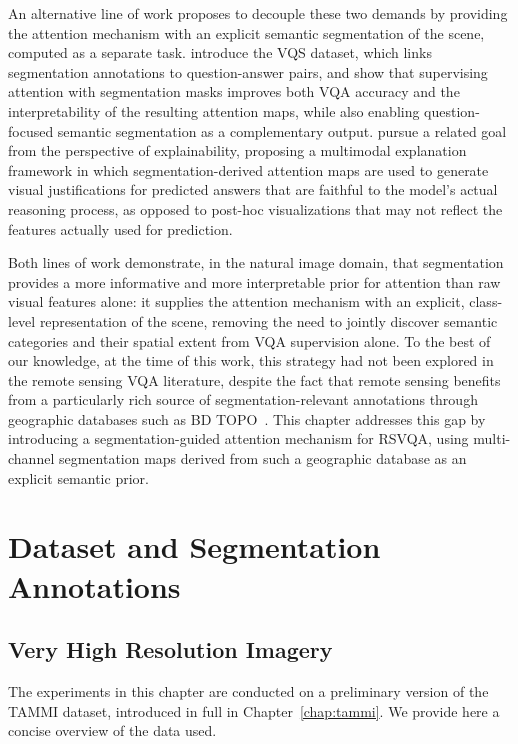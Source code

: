 An alternative line of work proposes to decouple these two
demands by providing the attention mechanism with an
explicit semantic segmentation of the scene, computed as
a separate task. \textcite{gan2017vqs} introduce the VQS
dataset, which links segmentation annotations to
question-answer pairs, and show that supervising attention
with segmentation masks improves both VQA accuracy and
the interpretability of the resulting attention maps, while
also enabling question-focused semantic segmentation as a
complementary output. \textcite{wu2018faithful} pursue a
related goal from the perspective of explainability,
proposing a multimodal explanation framework in which
segmentation-derived attention maps are used to generate
visual justifications for predicted answers that are
faithful to the model's actual reasoning process, as
opposed to post-hoc visualizations that may not reflect
the features actually used for prediction.

Both lines of work demonstrate, in the natural image
domain, that segmentation provides a more informative and
more interpretable prior for attention than raw visual
features alone: it supplies the attention mechanism with
an explicit, class-level representation of the scene,
removing the need to jointly discover semantic categories
and their spatial extent from VQA supervision alone. To
the best of our knowledge, at the time of this work, this
strategy had not been explored in the remote sensing VQA
literature, despite the fact that remote sensing benefits
from a particularly rich source of segmentation-relevant
annotations through geographic databases such as BD
TOPO~\cite{bdtopo}. This chapter addresses this gap by
introducing a segmentation-guided attention mechanism for
RSVQA, using multi-channel segmentation maps derived from
such a geographic database as an explicit semantic prior.

\section{Dataset and Segmentation Annotations}
\label{sec:chap4_dataset}

\subsection{Very High Resolution Imagery}
\label{sec:chap4_dataset_vhr}

The experiments in this chapter are conducted on a
preliminary version of the TAMMI dataset, introduced in
full in Chapter~\ref{chap:tammi}. We provide here a concise
overview of the data used.


